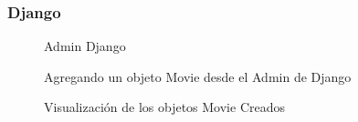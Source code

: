 \documentclass{article}
\begin{document}
  \subsubsection{Django}
  \begin{figure}[H]
    \centering
    \caption{Admin Django}
  \end{figure}
  \begin{figure}[H]
    \centering
    \caption{Agregando un objeto Movie desde el Admin de Django}
  \end{figure}
  \begin{figure}[H]
    \centering
    \caption{Visualización de los objetos Movie Creados}
  \end{figure}
\end{document}
